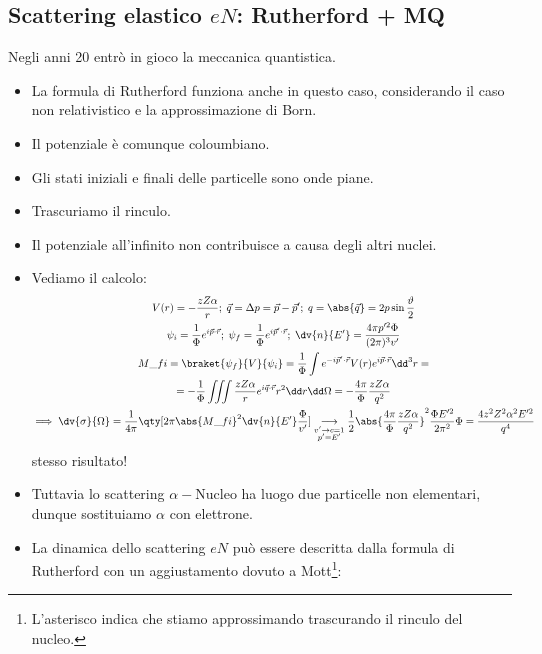 \subsection{Scattering elastico $eN$: Rutherford + MQ}
Negli anni 20 entrò in gioco la meccanica quantistica. 
\begin{itemize}
    \item La formula di Rutherford funziona anche in questo caso, considerando il caso non relativistico e la approssimazione di Born.
    \item Il potenziale è comunque coloumbiano.
    \item Gli stati iniziali e finali delle particelle sono onde piane.
    \item Trascuriamo il rinculo.
    \item Il potenziale all'infinito non contribuisce a causa degli altri nuclei.
    \item Vediamo il calcolo:
    \begin{gather*}
        V(r)=-\frac{zZ\alpha}r;\;\vec q=\Delta p=\vec p-\vec p';\;q=\abs{\vec q}=2p\sin\frac\vartheta2\\
        \psi_i=\frac1\Phi e^{i\vec p\cdot \vec r};\;\psi_f=\frac1\Phi e^{i\vec p'\cdot \vec r};\; \dv{n}{E'}=\frac{4\pi p'^2\Phi}{(2\pi)^3v'}\\
        M\_{fi}=\braket{\psi_f}{V}{\psi_i}=\frac1\Phi\int e^{-i\vec p'\cdot\vec r}V(r)e^{i\vec p\cdot\vec r}\dd^3r=\\
        =-\frac1\Phi\iiint \frac{zZ\alpha}re^{i\vec q\cdot\vec r}r^2\dd r\dd\Omega=-\frac{4\pi}\Phi\frac{zZ\alpha}{q^2}\\
        \implies \dv{\sigma}{\Omega}=\frac1{4\pi}\qty[2\pi\abs{M\_{fi}}^2\dv{n}{E'}\frac\Phi{v'}]\underset{\begin{subarray}{c}
            v'\to c=1\\
            p'=E'
         \end{subarray}}{\longrightarrow}\frac12\abs{\frac{4\pi}\Phi\frac{zZ\alpha}{q^2}}^2\frac{\Phi E'^2}{2\pi^2}\Phi=\frac{4z^2Z^2\alpha^2E'^2}{q^4}
    \end{gather*}
    stesso risultato!
    \item Tuttavia lo scattering $\alpha-$Nucleo ha luogo due particelle non elementari, dunque sostituiamo $\alpha$ con elettrone. 
    \item La dinamica dello scattering $eN$ può essere descritta dalla formula di Rutherford con un aggiustamento dovuto a Mott\footnote{L'asterisco indica che stiamo approssimando trascurando il rinculo del nucleo.}:

\end{itemize}
